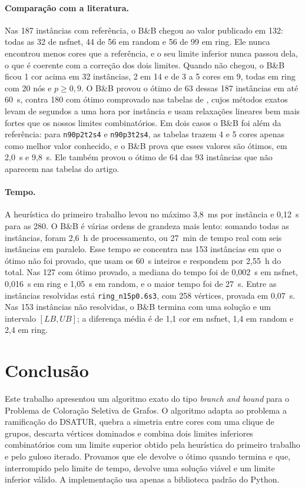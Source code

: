 \documentclass[12pt]{article}
\newcommand{\LB}{\mathit{LB}}
\newcommand{\UB}{\mathit{UB}}
\begin{document}
\paragraph{Comparação com a literatura.} Nas 187 instâncias com referência, o
B\&B chegou ao valor publicado em 132: todas as 32 de nsfnet, 44 de 56 em
random e 56 de 99 em ring. Ele nunca encontrou menos cores que a referência,
e o seu limite inferior nunca passou dela, o que é coerente com a correção
dos dois limites. Quando não chegou, o B\&B ficou 1 cor acima em 32
instâncias, 2 em 14 e de 3 a 5 cores em 9, todas em ring com 20 nós e
$p\ge0{,}9$. O B\&B provou o ótimo de 63 dessas 187 instâncias em até 60~s,
contra 180 com ótimo comprovado nas tabelas de \cite{furini2018}, cujos
métodos exatos levam de segundos a uma hora por instância e usam relaxações
lineares bem mais fortes que os nossos limites combinatórios. Em dois casos o
B\&B foi além da referência: para \texttt{n90p2t2s4} e \texttt{n90p3t2s4}, as
tabelas trazem 4 e 5 cores apenas como melhor valor conhecido, e o B\&B prova
que esses valores são ótimos, em 2,0~s e 9,8~s. Ele também provou o ótimo de
64 das 93 instâncias que não aparecem nas tabelas do artigo.

\paragraph{Tempo.} A heurística do primeiro trabalho levou no máximo 3,8~ms
por instância e 0,12~s para as 280. O B\&B é várias ordens de grandeza mais
lento: somando todas as instâncias, foram 2,6~h de processamento, ou 27~min
de tempo real com seis instâncias em paralelo. Esse tempo se concentra nas
153 instâncias em que o ótimo não foi provado, que usam os 60~s inteiros e
respondem por 2,55~h do total. Nas 127 com ótimo provado, a mediana do tempo foi de
0,002~s em nsfnet, 0,016~s em ring e 1,05~s em random, e o maior tempo foi de
27~s. Entre as instâncias resolvidas está \texttt{ring\_n15p0.6s3}, com 258
vértices, provada em 0,07~s. Nas 153 instâncias não resolvidas, o B\&B termina
com uma solução e um intervalo $[\LB,\UB]$; a diferença média é de 1,1 cor em
nsfnet, 1,4 em random e 2,4 em ring.

\section{Conclusão}\label{sec:conclusao}

Este trabalho apresentou um algoritmo exato do tipo \emph{branch and bound}
para o Problema de Coloração Seletiva de Grafos. O algoritmo adapta ao
problema a ramificação do DSATUR, quebra a simetria entre cores com uma
clique de grupos, descarta vértices dominados e combina dois limites
inferiores combinatórios com um limite superior obtido pela heurística do
primeiro trabalho e pelo guloso iterado. Provamos que ele devolve o ótimo
quando termina e que, interrompido pelo limite de tempo, devolve uma solução
viável e um limite inferior válido. A implementação usa apenas a biblioteca
padrão do Python.
\end{document}

